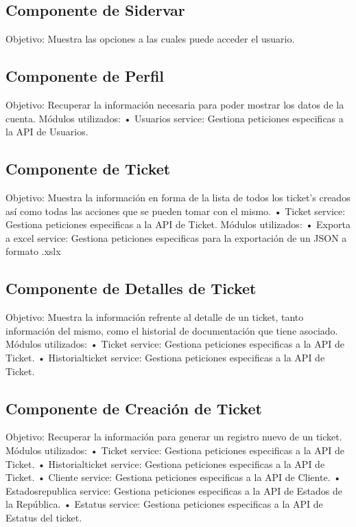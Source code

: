 \subsection{Componente de Sidervar}
Objetivo: Muestra las opciones a las cuales puede acceder el usuario.
\subsection{Componente de Perfil}
Objetivo: Recuperar la información necesaria para poder mostrar los datos de la cuenta.
\newline
Módulos utilizados: 
\newline
• Usuarios service: Gestiona peticiones especificas a la API de Usuarios.

\subsection{Componente de Ticket}
Objetivo: Muestra la información en forma de la lista de todos los ticket's creados así como todas las acciones que se pueden tomar con el mismo.
\newline
• Ticket service: Gestiona peticiones especificas a la API de Ticket.
\newline
Módulos utilizados: 
\newline
• Exporta a excel service: Gestiona peticiones especificas para la exportación de un JSON a formato .xslx
\subsection{Componente de Detalles de Ticket}
Objetivo: Muestra la información refrente al detalle de un ticket, tanto información del mismo, como el historial de documentación que tiene asociado. 
\newline
Módulos utilizados: 
\newline
• Ticket service: Gestiona peticiones especificas a la API de Ticket.
\newline
• Historialticket  service: Gestiona peticiones especificas a la API de Ticket.
\subsection{Componente de Creación de Ticket} 
Objetivo: Recuperar la información para generar un registro nuevo de un ticket. 
\newline
Módulos utilizados: 
\newline
• Ticket service: Gestiona peticiones especificas a la API de Ticket.
\newline
• Historialticket service: Gestiona peticiones especificas a la API de Ticket.
\newline
• Cliente  service: Gestiona peticiones especificas a la API de Cliente.
\newline
• Estadosrepublica  service: Gestiona peticiones especificas a la API de Estados de la República.
\newline
• Estatus  service: Gestiona peticiones especificas a la API de Estatus del ticket.
